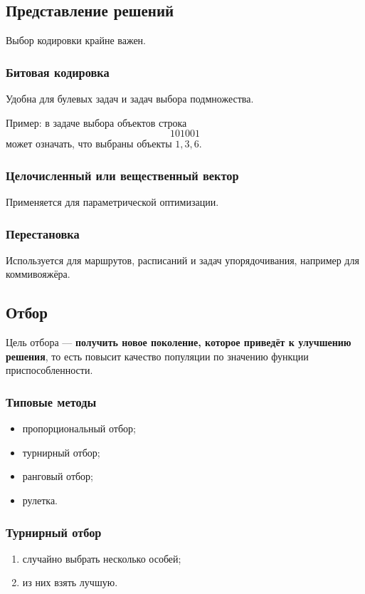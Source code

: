 \documentclass[12pt,a4paper]{article}
\theoremstyle{definition}
\theoremstyle{plain}
\begin{document}
\subsection{Представление решений}
Выбор кодировки крайне важен.

\subsubsection{Битовая кодировка}
Удобна для булевых задач и задач выбора подмножества.

Пример: в задаче выбора объектов строка
\[
101001
\]
может означать, что выбраны объекты $1,3,6$.

\subsubsection{Целочисленный или вещественный вектор}
Применяется для параметрической оптимизации.

\subsubsection{Перестановка}
Используется для маршрутов, расписаний и задач упорядочивания, например для коммивояжёра.

\subsection{Отбор}
Цель отбора --- \textbf{получить новое поколение, которое приведёт к улучшению решения}, то есть повысит качество популяции по значению функции приспособленности.

\subsubsection{Типовые методы}
\begin{itemize}
\item пропорциональный отбор;
\item турнирный отбор;
\item ранговый отбор;
\item рулетка.
\end{itemize}

\subsubsection{Турнирный отбор}
\begin{enumerate}
\item случайно выбрать несколько особей;
\item из них взять лучшую.
\end{enumerate}
\end{document}
